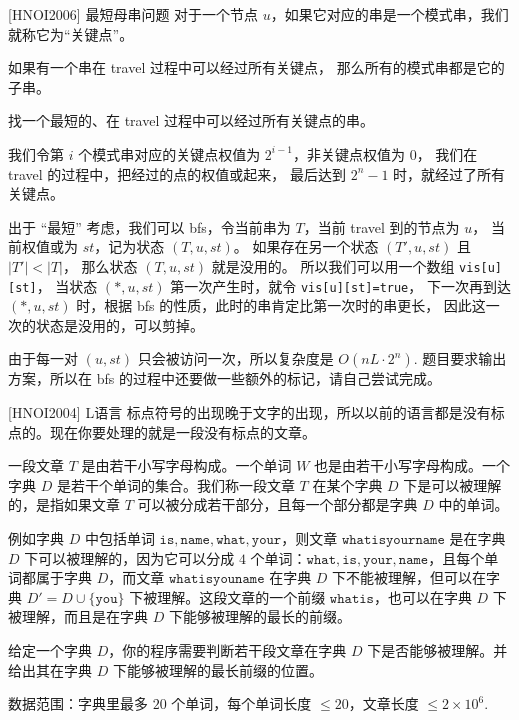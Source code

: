 \documentclass{beamer}
\begin{document}
\begin{frame}[fragile]{[HNOI2006] 最短母串问题}
    \footnotesize
    对于一个节点 $u$，如果它对应的串是一个模式串，我们就称它为“关键点”。

    \vspace{.7em}
    如果有一个串在 travel 过程中可以经过所有关键点，
    那么所有的模式串都是它的子串。

    \vspace{.7em}
    找一个最短的、在 travel 过程中可以经过所有关键点的串。

    \vspace{.7em}\pause
    我们令第 $i$ 个模式串对应的关键点权值为 $2^{i-1}$，非关键点权值为 $0$，
    我们在 travel 的过程中，把经过的点的权值或起来，
    最后达到 $2^n-1$ 时，就经过了所有关键点。

    \vspace{.7em}\pause
    出于 “最短” 考虑，我们可以 bfs，令当前串为 $T$，当前 travel 到的节点为 $u$，
    当前权值或为 $st$，记为状态 $(T,u,st)$。
    \pause 如果存在另一个状态 $(T',u,st)$ 且 $|T'|<|T|$，
    那么状态 $(T,u,st)$ 就是没用的。
    \pause 所以我们可以用一个数组 \verb|vis[u][st]|，
    当状态 $(*,u,st)$ 第一次产生时，就令 \verb|vis[u][st]=true|，
    下一次再到达 $(*,u,st)$ 时，根据 bfs 的性质，此时的串肯定比第一次时的串更长，
    因此这一次的状态是没用的，可以剪掉。

    \vspace{.7em}\pause
    由于每一对 $(u,st)$ 只会被访问一次，所以复杂度是 $O(nL\cdot 2^n)$. 
    题目要求输出方案，所以在 bfs 的过程中还要做一些额外的标记，请自己尝试完成。
\end{frame}

\begin{frame}[fragile]{[HNOI2004] L语言}
    \footnotesize
    标点符号的出现晚于文字的出现，所以以前的语言都是没有标点的。现在你要处理的就是一段没有标点的文章。  

    \vspace{1em}
    一段文章 $T$ 是由若干小写字母构成。一个单词 $W$ 也是由若干小写字母构成。一个字典 $D$ 是若干个单词的集合。我们称一段文章 $T$ 在某个字典 $D$ 下是可以被理解的，是指如果文章 $T$ 可以被分成若干部分，且每一个部分都是字典 $D$ 中的单词。  
    
    \vspace{1em}
    例如字典 $D$ 中包括单词 $\texttt{is},\texttt{name},\texttt{what},\texttt{your}$，则文章 $\texttt{whatisyourname}$ 是在字典 $D$ 下可以被理解的，因为它可以分成 $4$ 个单词：$\texttt{what},\texttt{is},\texttt{your},\texttt{name}$，且每个单词都属于字典 $D$，而文章 $\texttt{whatisyouname}$ 在字典 $D$ 下不能被理解，但可以在字典 $D'=D\cup\{\texttt{you}\}$ 下被理解。这段文章的一个前缀 $\texttt{whatis}$，也可以在字典 $D$ 下被理解，而且是在字典 $D$ 下能够被理解的最长的前缀。  
    
    \vspace{1em}
    给定一个字典 $D$，你的程序需要判断若干段文章在字典 $D$ 下是否能够被理解。并给出其在字典 $D$ 下能够被理解的最长前缀的位置。

    \vspace{1em}
    数据范围：字典里最多 $20$ 个单词，每个单词长度 $\leq 20$，文章长度 $\leq 2\times10^6$.
\end{frame}
\end{document}
